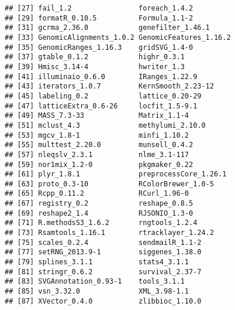 \documentclass{article}\usepackage{knitr}
\begin{document}
\begin{knitrout}
\begin{kframe}
\begin{verbatim}
## [27] fail_1.2                foreach_1.4.2          
## [29] formatR_0.10.5          Formula_1.1-2          
## [31] gcrma_2.36.0            genefilter_1.46.1      
## [33] GenomicAlignments_1.0.2 GenomicFeatures_1.16.2 
## [35] GenomicRanges_1.16.3    gridSVG_1.4-0          
## [37] gtable_0.1.2            highr_0.3.1            
## [39] Hmisc_3.14-4            hwriter_1.3            
## [41] illuminaio_0.6.0        IRanges_1.22.9         
## [43] iterators_1.0.7         KernSmooth_2.23-12     
## [45] labeling_0.2            lattice_0.20-29        
## [47] latticeExtra_0.6-26     locfit_1.5-9.1         
## [49] MASS_7.3-33             Matrix_1.1-4           
## [51] mclust_4.3              methylumi_2.10.0       
## [53] mgcv_1.8-1              minfi_1.10.2           
## [55] multtest_2.20.0         munsell_0.4.2          
## [57] nleqslv_2.3.1           nlme_3.1-117           
## [59] nor1mix_1.2-0           pkgmaker_0.22          
## [61] plyr_1.8.1              preprocessCore_1.26.1  
## [63] proto_0.3-10            RColorBrewer_1.0-5     
## [65] Rcpp_0.11.2             RCurl_1.96-0           
## [67] registry_0.2            reshape_0.8.5          
## [69] reshape2_1.4            RJSONIO_1.3-0          
## [71] R.methodsS3_1.6.2       rngtools_1.2.4         
## [73] Rsamtools_1.16.1        rtracklayer_1.24.2     
## [75] scales_0.2.4            sendmailR_1.1-2        
## [77] setRNG_2013.9-1         siggenes_1.38.0        
## [79] splines_3.1.1           stats4_3.1.1           
## [81] stringr_0.6.2           survival_2.37-7        
## [83] SVGAnnotation_0.93-1    tools_3.1.1            
## [85] vsn_3.32.0              XML_3.98-1.1           
## [87] XVector_0.4.0           zlibbioc_1.10.0
\end{verbatim}
\end{kframe}
\end{knitrout}

\clearpage
\end{document}
